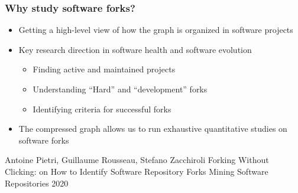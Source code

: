 \documentclass[aspectratio=169,xcolor=table]{beamer}
\begin{document}
    \begin{frame}
        \frametitle{Why study software forks?}

        \begin{block}{}
            \begin{itemize}
                \item Getting a high-level view of how the graph is organized
                    in software projects
                \item Key research direction in software health and software
                    evolution
                    \begin{itemize}
                        \item Finding active and maintained projects
                        \item Understanding ``Hard'' and ``development'' forks
                        \item Identifying criteria for successful forks
                    \end{itemize}
                \item The compressed graph allows us to run exhaustive
                    quantitative studies on software forks
            \end{itemize}

            \footnotesize
            \begin{thebibliography}{swhforks}
                 Antoine Pietri, Guillaume Rousseau, Stefano Zacchiroli\newblock
                Forking Without Clicking: on How to Identify Software Repository Forks\newblock
                Mining Software Repositories 2020\newblock
            \end{thebibliography}
        \end{block}
    \end{frame}
\end{document}
